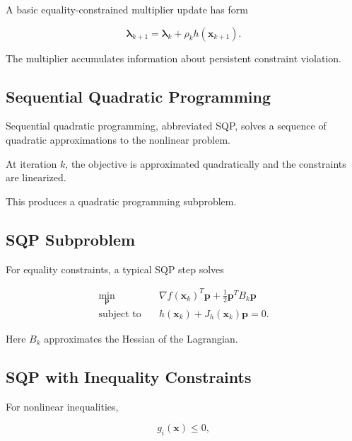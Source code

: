 A basic equality-constrained multiplier update has form

\[
\boxed{
\boldsymbol{\lambda}_{k+1}
=
\boldsymbol{\lambda}_k
+
\rho_k
h(\mathbf{x}_{k+1}).
}
\]

The multiplier accumulates information about persistent constraint
violation.

\subsection{Sequential Quadratic Programming}
\label{subsec:sequential-quadratic-programming}

Sequential quadratic programming, abbreviated SQP, solves a sequence of
quadratic approximations to the nonlinear problem.

At iteration \(k\), the objective is approximated quadratically and the
constraints are linearized.

This produces a quadratic programming subproblem.

\subsection{SQP Subproblem}
\label{subsec:sqp-subproblem}

For equality constraints, a typical SQP step solves

\[
\boxed{
\begin{aligned}
\min_{\mathbf{p}}
\quad&
\nabla f(\mathbf{x}_k)^T\mathbf{p}
+
\frac12
\mathbf{p}^TB_k\mathbf{p}
\\
\text{subject to}
\quad&
h(\mathbf{x}_k)
+
J_h(\mathbf{x}_k)\mathbf{p}
=
0.
\end{aligned}
}
\]

Here \(B_k\) approximates the Hessian of the Lagrangian.

\subsection{SQP with Inequality Constraints}
\label{subsec:sqp-inequality}

For nonlinear inequalities,

\[
g_i(\mathbf{x})\leq0,
\]


